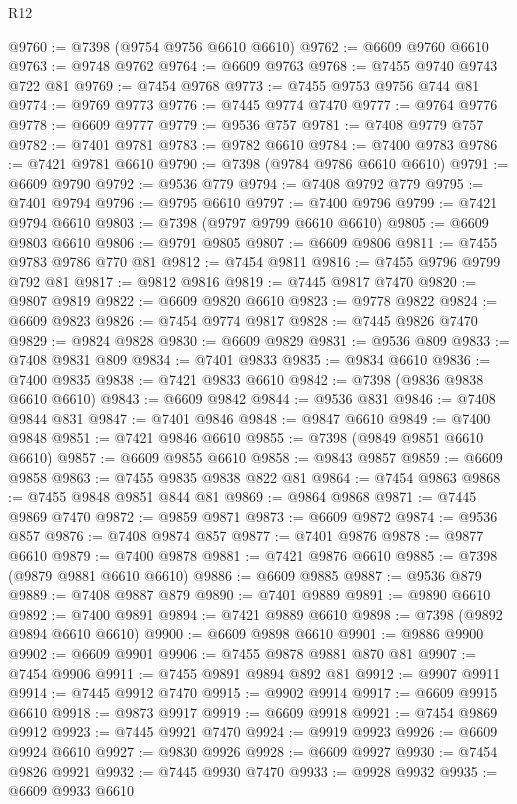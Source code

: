 \begin{lexlean}{R12}
\begin{coremodule}
{{{{{{{{{{{{{{{{{{{{{{{{{{{{{{{{{{{{{{{{{{{{{{{{{{{{{{{{{{{{{{{{{{{{{{{{{{{{{{{{{{@9760 := @7398 (@9754 @9756 @6610 @6610)
@9762 := @6609 @9760 @6610
@9763 := @9748 @9762
@9764 := @6609 @9763
@9768 := @7455 @9740 @9743 @722 @81
@9769 := @7454 @9768
@9773 := @7455 @9753 @9756 @744 @81
@9774 := @9769 @9773
@9776 := @7445 @9774 @7470
@9777 := @9764 @9776
@9778 := @6609 @9777
@9779 := @9536 @757
@9781 := @7408 @9779 @757
@9782 := @7401 @9781
@9783 := @9782 @6610
@9784 := @7400 @9783
@9786 := @7421 @9781 @6610
@9790 := @7398 (@9784 @9786 @6610 @6610)
@9791 := @6609 @9790
@9792 := @9536 @779
@9794 := @7408 @9792 @779
@9795 := @7401 @9794
@9796 := @9795 @6610
@9797 := @7400 @9796
@9799 := @7421 @9794 @6610
@9803 := @7398 (@9797 @9799 @6610 @6610)
@9805 := @6609 @9803 @6610
@9806 := @9791 @9805
@9807 := @6609 @9806
@9811 := @7455 @9783 @9786 @770 @81
@9812 := @7454 @9811
@9816 := @7455 @9796 @9799 @792 @81
@9817 := @9812 @9816
@9819 := @7445 @9817 @7470
@9820 := @9807 @9819
@9822 := @6609 @9820 @6610
@9823 := @9778 @9822
@9824 := @6609 @9823
@9826 := @7454 @9774 @9817
@9828 := @7445 @9826 @7470
@9829 := @9824 @9828
@9830 := @6609 @9829
@9831 := @9536 @809
@9833 := @7408 @9831 @809
@9834 := @7401 @9833
@9835 := @9834 @6610
@9836 := @7400 @9835
@9838 := @7421 @9833 @6610
@9842 := @7398 (@9836 @9838 @6610 @6610)
@9843 := @6609 @9842
@9844 := @9536 @831
@9846 := @7408 @9844 @831
@9847 := @7401 @9846
@9848 := @9847 @6610
@9849 := @7400 @9848
@9851 := @7421 @9846 @6610
@9855 := @7398 (@9849 @9851 @6610 @6610)
@9857 := @6609 @9855 @6610
@9858 := @9843 @9857
@9859 := @6609 @9858
@9863 := @7455 @9835 @9838 @822 @81
@9864 := @7454 @9863
@9868 := @7455 @9848 @9851 @844 @81
@9869 := @9864 @9868
@9871 := @7445 @9869 @7470
@9872 := @9859 @9871
@9873 := @6609 @9872
@9874 := @9536 @857
@9876 := @7408 @9874 @857
@9877 := @7401 @9876
@9878 := @9877 @6610
@9879 := @7400 @9878
@9881 := @7421 @9876 @6610
@9885 := @7398 (@9879 @9881 @6610 @6610)
@9886 := @6609 @9885
@9887 := @9536 @879
@9889 := @7408 @9887 @879
@9890 := @7401 @9889
@9891 := @9890 @6610
@9892 := @7400 @9891
@9894 := @7421 @9889 @6610
@9898 := @7398 (@9892 @9894 @6610 @6610)
@9900 := @6609 @9898 @6610
@9901 := @9886 @9900
@9902 := @6609 @9901
@9906 := @7455 @9878 @9881 @870 @81
@9907 := @7454 @9906
@9911 := @7455 @9891 @9894 @892 @81
@9912 := @9907 @9911
@9914 := @7445 @9912 @7470
@9915 := @9902 @9914
@9917 := @6609 @9915 @6610
@9918 := @9873 @9917
@9919 := @6609 @9918
@9921 := @7454 @9869 @9912
@9923 := @7445 @9921 @7470
@9924 := @9919 @9923
@9926 := @6609 @9924 @6610
@9927 := @9830 @9926
@9928 := @6609 @9927
@9930 := @7454 @9826 @9921
@9932 := @7445 @9930 @7470
@9933 := @9928 @9932
@9935 := @6609 @9933 @6610
}}}}}}}}}}}}}}}}}}}}}}}}}}}}}}}}}}}}}}}}}}}}}}}}}}}}}}}}}}}}}}}}}}}}}}}}}}}}}}}}}}
\end{coremodule}
\end{lexlean}
